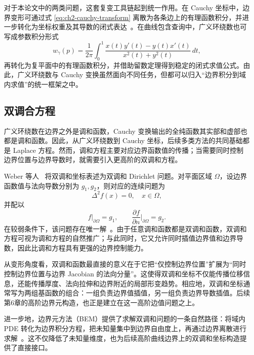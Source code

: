 对于本论文中的两类问题，这套复变工具链起到统一作用。在 Cauchy 坐标中，边界变形可通过式 \eqref{eq:ch2-cauchy-transform} 离散为各条边上的有理函数积分，并进一步转化为坐标权重及其导数的闭式表达~\cite{Weber2009,Lin2024PolynomialCC}。在曲线包含查询中，广义环绕数也可写成参数积分形式
\begin{equation}
w_{\gamma}(p)
=\frac{1}{2\pi}\int_0^1
\frac{x(t)y'(t)-y(t)x'(t)}{x^2(t)+y^2(t)}\,dt,
\label{eq:ch2-gwn-integral}
\end{equation}
再转化为复平面中的有理函数积分，并借助留数定理得到稳定的闭式求值公式。由此，广义环绕数与 Cauchy 变换虽然面向不同任务，但都可以归入“边界积分到域内求值”的统一框架之中。

\subsection{双调合方程}
广义环绕数在边界之外是调和函数，Cauchy 变换输出的全纯函数其实部和虚部也都是调和函数。因此，从广义环绕数到 Cauchy 坐标，后续多类方法的共同基础都是 Laplace 方程。然而，调和方程主要对应边界函数值的传播；当需要同时控制边界位置与边界导数时，就需要引入更高阶的双调和方程。

Weber 等人~\cite{Weber2012} 将双调和坐标表述为双调和 Dirichlet 问题。对平面区域 \(\Omega\)，设边界函数值与法向导数分别为 \(g_1,g_2\)，则对应的连续问题为
\begin{equation}
\Delta^2 f(x)=0,\quad x\in\Omega,
\label{eq:ch2-biharmonic-pde}
\end{equation}
并配以
\begin{equation}
f\big|_{\partial\Omega}=g_1,\qquad
\frac{\partial f}{\partial n}\Big|_{\partial\Omega}=g_2.
\label{eq:ch2-biharmonic-bc}
\end{equation}
在较弱条件下，该问题存在唯一解~\cite{Weber2012}。由于任意调和函数都是双调和函数，双调和方程可视为调和方程的自然推广；与此同时，它又允许同时插值边界值和边界导数，因此比调和方程具有更强的边界控制能力。

从变形角度看，双调和函数最直接的意义在于它把“仅控制边界位置”扩展为“同时控制边界位置与边界 Jacobian 的法向分量”。这使得双调和坐标不仅能传播位移信息，还能传播厚度、法向拉伸和边界附近的局部形变趋势。相应地，双调和坐标通常写为两组基函数的组合：一组负责边界值插值，另一组负责边界导数插值。后续第6章的高阶边界元构造，也正是建立在这一高阶边值问题之上。


进一步地，边界元方法（BEM）提供了求解双调和问题的一条自然路径：将域内 PDE 转化为边界积分方程，把未知量集中到边界自由度上，再通过边界离散进行求解~\cite{Weber2012,thiery2024biharmonic}。这不仅降低了未知量维度，也为后续高阶曲线边界上的双调和坐标构造提供了直接接口。


